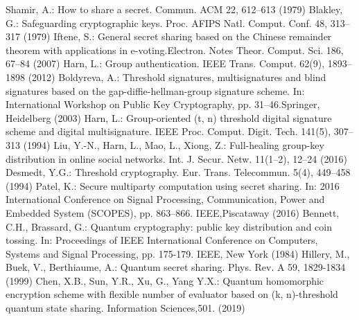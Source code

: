 \documentclass[pdflatex,sn-mathphys]{sn-jnl}%
\theoremstyle{thmstyleone}%
\theoremstyle{thmstyletwo}%
\theoremstyle{thmstylethree}%
\begin{document}
\noindent




\begin{appendices}


\begin{thebibliography}{999}
	Shamir, A.: How to share a secret. Commun. ACM 22, 612–613 (1979)
	Blakley, G.: Safeguarding cryptographic keys. Proc. AFIPS Natl. Comput. Conf. 48, 313–317 (1979)
	Iftene, S.: General secret sharing based on the Chinese remainder theorem with applications in e-voting.Electron. Notes Theor. Comput. Sci. 186, 67–84 (2007)
	Harn, L.: Group authentication. IEEE Trans. Comput. 62(9), 1893–1898 (2012)
	Boldyreva, A.: Threshold signatures, multisignatures and blind signatures based on the gap-diffie-hellman-group signature scheme. In: International Workshop on Public Key Cryptography, pp. 31–46.Springer, Heidelberg (2003)
	Harn, L.: Group-oriented (t, n) threshold digital signature scheme and digital multisignature. IEEE Proc. Comput. Digit. Tech. 141(5), 307–313 (1994)
	Liu, Y.-N., Harn, L., Mao, L., Xiong, Z.: Full-healing group-key distribution in online social networks. Int. J. Secur. Netw. 11(1–2), 12–24 (2016)
	Desmedt, Y.G.: Threshold cryptography. Eur. Trans. Telecommun. 5(4), 449–458 (1994)
	Patel, K.: Secure multiparty computation using secret sharing. In: 2016 International Conference on Signal Processing, Communication, Power and Embedded System (SCOPES), pp. 863–866. IEEE,Piscataway (2016)
	Bennett, C.H., Brassard, G.: Quantum cryptography: public key distribution and coin tossing. In: Proceedings of IEEE International Conference on Computers, Systems and Signal Processing, pp. 175-179. IEEE, New York (1984)
	Hillery, M., Buek, V., Berthiaume, A.: Quantum secret sharing. Phys. Rev. A 59, 1829-1834 (1999)
	Chen, X.B., Sun, Y.R., Xu, G., Yang Y.X.: Quantum homomorphic encryption scheme with flexible number of evaluator based on (k, n)-threshold quantum state sharing. Information Sciences,501. (2019)

\end{thebibliography}
\end{appendices}
\end{document}

